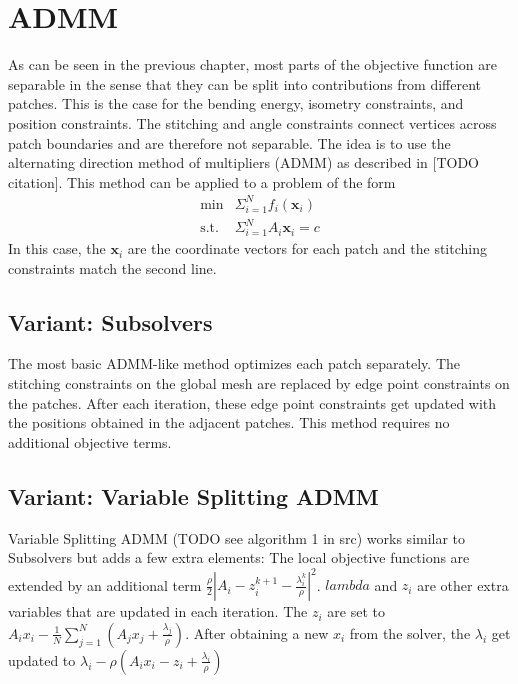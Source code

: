 \documentclass[a4paper,twoside,12pt,nochapterprefix]{scrbook}
\begin{document}
\chapter{ADMM}\label{sec:admm}
As can be seen in the previous chapter, most parts of the objective function are separable in the sense that they can be split into contributions from different patches. This is the case for the bending energy, isometry constraints, and position constraints. The stitching and angle constraints connect vertices across patch boundaries and are therefore not separable.\newline
The idea is to use the alternating direction method of multipliers (ADMM) as described in [TODO citation]. This method can be applied to a problem of the form
\begin{equation}
\begin{array}{lr}
\mbox{min} & \Sigma_{i=1}^{N} f_i(\mathbf{x}_i) \\
\mbox{s.t.} & \Sigma_{i=1}^{N} A_i \mathbf{x}_i = c
\end{array}
\end{equation}
In this case, the $\mathbf{x}_i$ are the coordinate vectors for each patch and the stitching constraints match the second line.\newline
\section{Variant: Subsolvers}
The most basic ADMM-like method optimizes each patch separately. The stitching constraints on the global mesh are replaced by edge point constraints on the patches. After each iteration, these edge point constraints get updated with the positions obtained in the adjacent patches. This method requires no additional objective terms.\newline
\section{Variant: Variable Splitting ADMM}
Variable Splitting ADMM (TODO see algorithm 1 in src) works similar to Subsolvers but adds a few extra elements: The local objective functions%
 are extended by an additional term $\frac{\rho}{2}|A_i - z^{k+1}_i -\frac{\lambda_i^k}{\rho} |^2$. $lambda$ and $z_i$ are other extra variables that are updated in each iteration. The $z_i$ are set to $A_i x_i - \frac{1}{N}\sum_{j=1}^N(A_j x_j + \frac{\lambda_j}{\rho})$. After obtaining a new $x_i$ from the solver, the $\lambda_i$ get updated to $\lambda_i - \rho(A_i x_i - z_i +\frac{\lambda_i}{\rho})$
\end{document}
